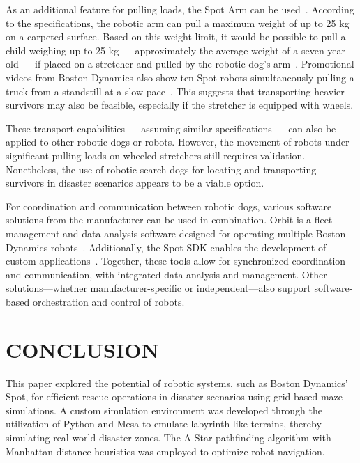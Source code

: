 \documentclass[a4paper,twoside]{article}
\begin{document}
As an additional feature for pulling loads, the Spot Arm can be used\ \cite{boston_dynamics_2024_spot_arm}.
According to the specifications, the robotic arm can pull a maximum weight of up to 25 kg on a carpeted surface. 
Based on this weight limit, it would be possible to pull a child weighing up to 25 kg — approximately the average weight of a seven-year-old — if placed on a stretcher and pulled by the robotic dog’s arm\ \cite{stolzenberg2007koerpermasse}.
Promotional videos from Boston Dynamics also show ten Spot robots simultaneously pulling a truck from a standstill at a slow pace\ \cite{boston_dynamics_2019_spotmini_truck}.
This suggests that transporting heavier survivors may also be feasible, especially if the stretcher is equipped with wheels.

These transport capabilities — assuming similar specifications — can also be applied to other robotic dogs or robots. 
However, the movement of robots under significant pulling loads on wheeled stretchers still requires validation.
Nonetheless, the use of robotic search dogs for locating and transporting survivors in disaster scenarios appears to be a viable option.

For coordination and communication between robotic dogs, various software solutions from the manufacturer can be used in combination. 
Orbit is a fleet management and data analysis software designed for operating multiple Boston Dynamics robots\ \cite{boston_dynamics_2024_orbit}.
Additionally, the Spot SDK enables the development of custom applications\ \cite{boston_dynamics_2025_spot_sdk}.
Together, these tools allow for synchronized coordination and communication, with integrated data analysis and management. 
Other solutions—whether manufacturer-specific or independent—also support software-based orchestration and control of robots.

\section{\uppercase{Conclusion}}
\label{sec:conclusion}

This paper explored the potential of robotic systems, such as Boston Dynamics' Spot, for efficient rescue operations in disaster scenarios using grid-based maze simulations.
A custom simulation environment was developed through the utilization of Python and Mesa to emulate labyrinth-like terrains, thereby simulating real-world disaster zones.
The A-Star pathfinding algorithm with Manhattan distance heuristics was employed to optimize robot navigation.
\end{document}
